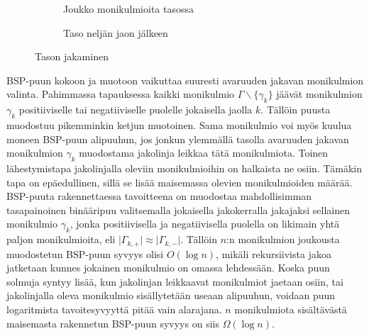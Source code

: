 \documentclass[a4paper, 12pt, titlepage]{article}
\newcommand{\abs}[1]{\vert #1 \vert} %
\begin{document}
\begin{figure}[htp]
 \centering
 \begin{subfigure}{0.5\textwidth} 
  \def\svgwidth{0.95\linewidth}
  
  \caption{Joukko monikulmioita tasossa}
  \label{bsp11}
 \end{subfigure}%
 \begin{subfigure}{0.5\textwidth} 
  \def\svgwidth{0.95\linewidth}
  
  \caption{Taso neljän jaon jälkeen}
  \label{bsp12}
 \end{subfigure}
 \caption{Tason jakaminen}
 \vspace{-0.5cm}
 \label{bsp1}
\end{figure}


BSP-puun kokoon ja muotoon vaikuttaa suuresti avaruuden jakavan monikulmion valinta. Pahimmassa tapauksessa kaikki monikulmio $\Gamma\backslash\{\gamma_k\}$ jäävät monikulmion $\gamma_k$ positiiviselle tai negatiiviselle puolelle jokaisella jaolla $k$. Tällöin puusta muodostuu pikemminkin ketjun muotoinen. Sama monikulmio voi myös kuulua moneen BSP-puun alipuuhun, jos jonkun ylemmällä tasolla avaruuden jakavan monikulmion $\gamma_k$ muodostama jakolinja leikkaa tätä monikulmiota. \citep[.]{samet} Toinen lähestymistapa jakolinjalla oleviin monikulmioihin on halkaista ne osiin. Tämäkin tapa on epäedullinen, sillä se lisää maisemassa olevien monikulmioiden määrää. \citep[.]{ranta}\\ %

BSP-puuta rakennettaessa tavoitteena on muodostaa mahdollisimman tasapainoinen binääripuu valitsemalla jokaisella jakokerralla jakajaksi sellainen monikulmio $\gamma_k$, jonka positiivisella ja negatiivisella puolella on likimain yhtä paljon monikulmioita, eli $\abs{\Gamma_{k,+}} \approx \abs{\Gamma_{k,-}}$. Tällöin  $n$:n monikulmion joukousta muodostetun BSP-puun syvyys olisi $O(\log n)$, mikäli rekursiivista jakoa jatketaan kunnes jokainen monikulmio on omassa lehdessään. Koska puun solmuja syntyy lisää, kun jakolinjan leikkaavat monikulmiot jaetaan osiin, tai jakolinjalla oleva monikulmio sisällytetään useaan alipuuhun, voidaan puun logaritmista tavoitesyvyyttä pitää vain alarajana. \citep[.]{hughes} $n$ monikulmiota sisältävästä maisemasta rakennetun BSP-puun syvyys on siis $\Omega(\log n)$.\\


\end{document}
